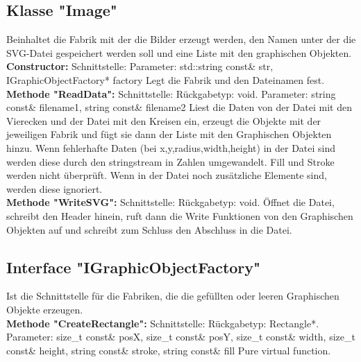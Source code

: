 \documentclass[12pt,a4paper]{article}
\begin{document}
\subsection {Klasse "Image"}
Beinhaltet die Fabrik mit der die Bilder erzeugt werden, den Namen unter der die SVG-Datei gespeichert werden soll und eine Liste mit den graphischen Objekten.
\\

\textbf {Constructor: } 
\newline
Schnittstelle: 
Parameter: std::string const\& str, IGraphicObjectFactory* factory
\newline
Legt die Fabrik und den Dateinamen fest.
\\

\textbf {Methode "ReadData": } 
\newline
Schnittstelle:
\newline
Rückgabetyp: void.
\newline
Parameter: string const\& filename1, string const\& filename2
\newline
Liest die Daten von der Datei mit den Vierecken und der Datei mit den Kreisen ein, erzeugt die Objekte mit der jeweiligen Fabrik und fügt sie dann der Liste mit den Graphischen Objekten hinzu. Wenn fehlerhafte Daten (bei x,y,radius,width,height) in der Datei sind werden diese durch den stringstream in Zahlen umgewandelt. Fill und Stroke werden nicht überprüft. Wenn in der Datei noch zusätzliche Elemente sind, werden diese ignoriert.
\\

\textbf {Methode "WriteSVG": } 
\newline
Schnittstelle: 
\newline
Rückgabetyp: void.
\newline
Öffnet die Datei, schreibt den Header hinein, ruft dann die Write Funktionen von den Graphischen Objekten auf und schreibt zum Schluss den Abschluss in die Datei.
\\


\subsection {Interface "IGraphicObjectFactory"}
Ist die Schnittstelle für die Fabriken, die die gefüllten oder leeren Graphischen Objekte erzeugen.
\\

\textbf {Methode "CreateRectangle": } 
\newline
Schnittstelle: 
\newline
Rückgabetyp: Rectangle*.
\newline
Parameter: size\_t const\& posX, size\_t const\& posY, size\_t const\& width, size\_t const\& height, string const\& stroke, string const\& fill
\newline
Pure virtual function.
\\
\end{document}
